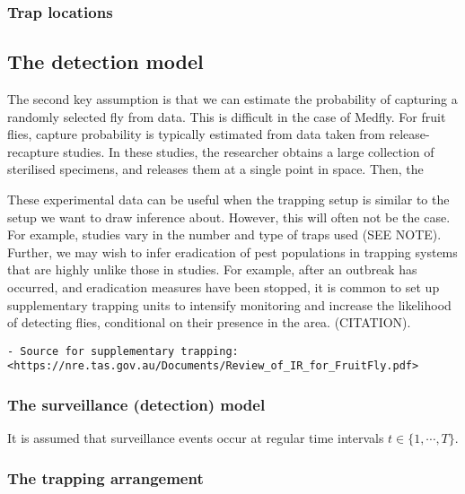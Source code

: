 \documentclass[
]{book}
\begin{document}
\hypertarget{trap-locations}{%
\subsubsection{Trap locations}\label{trap-locations}}

\hypertarget{the-detection-model}{%
\subsection{The detection model}\label{the-detection-model}}

The second key assumption is that we can estimate the probability of capturing a randomly selected fly from data. This is difficult in the case of Medfly. For fruit flies, capture probability is typically estimated from data taken from release-recapture studies. In these studies, the researcher obtains a large collection of sterilised specimens, and releases them at a single point in space. Then, the

These experimental data can be useful when the trapping setup is similar to the setup we want to draw inference about. However, this will often not be the case. For example, studies vary in the number and type of traps used (SEE NOTE). Further, we may wish to infer eradication of pest populations in trapping systems that are highly unlike those in studies. For example, after an outbreak has occurred, and eradication measures have been stopped, it is common to set up supplementary trapping units to intensify monitoring and increase the likelihood of detecting flies, conditional on their presence in the area. (CITATION).

\begin{verbatim}
- Source for supplementary trapping: <https://nre.tas.gov.au/Documents/Review_of_IR_for_FruitFly.pdf>
\end{verbatim}

\hypertarget{the-surveillance-detection-model}{%
\subsubsection{The surveillance (detection) model}\label{the-surveillance-detection-model}}

It is assumed that surveillance events occur at regular time intervals \(t \in \{1, \cdots, T\}\).

\hypertarget{the-trapping-arrangement}{%
\subsubsection{The trapping arrangement}\label{the-trapping-arrangement}}
\end{document}
